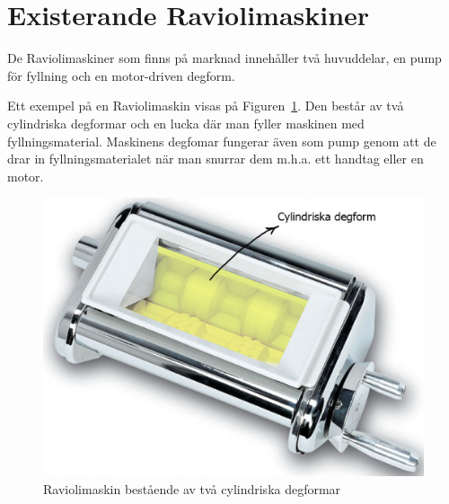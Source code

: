 \section{Existerande Raviolimaskiner}
De Raviolimaskiner som finns på marknad innehåller två huvuddelar, en pump för fyllning och en motor-driven degform. 

Ett exempel på en Raviolimaskin visas på Figuren~\ref{raviolihemma}. Den består av två cylindriska degformar och en lucka där man fyller maskinen med fyllningsmaterial. Maskinens degfomar fungerar även som pump genom att de drar in fyllningsmaterialet när man snurrar dem m.h.a. ett handtag eller en motor.
 	\begin{figure}[h]
 		\begin{center}
 			\includegraphics[scale=0.4]{images/ravioli_machine_comment.jpg}
 			\caption{Raviolimaskin bestående av två cylindriska degformar }
 			\label{raviolihemma}	
 		\end{center}
 	\end{figure}
 
